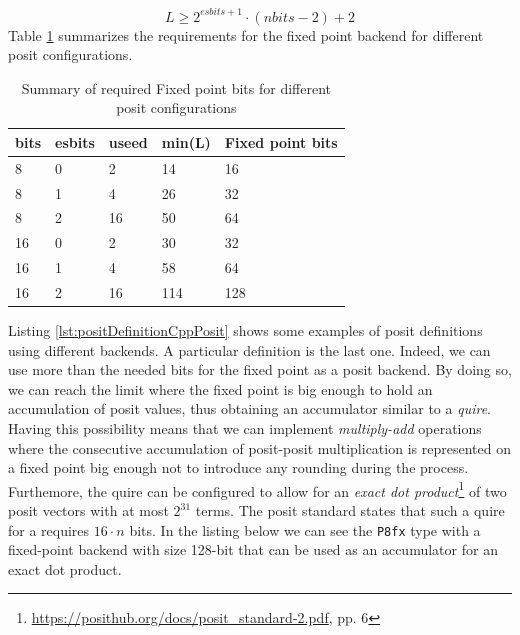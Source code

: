 \begin{equation}
    L \geq 2^{esbits + 1} \cdot (nbits - 2) + 2
\end{equation}
Table \ref{tab:fixedPointToPositSize} summarizes the requirements for the fixed point backend for different posit configurations.

\begin{table}[]
\centering
\caption{Summary of required Fixed point bits for different posit configurations}
\label{tab:fixedPointToPositSize}
\begin{tabular}{lllll}

bits & esbits & useed & min(L) & Fixed point bits \\ \hline
8    & 0      & 2     & 14     & 16               \\
8    & 1      & 4     & 26     & 32               \\
8    & 2      & 16    & 50     & 64               \\
16   & 0      & 2     & 30     & 32               \\
16   & 1      & 4     & 58     & 64               \\
16   & 2      & 16    & 114    & 128              \\ \hline
\end{tabular}
\end{table}

Listing \ref{lst:positDefinitionCppPosit} shows some examples of posit definitions using different backends. A particular definition is the last one. Indeed, we can use more than the needed bits for the fixed point as a posit backend. By doing so, we can reach the limit where the fixed point is big enough to hold an accumulation of posit values, thus obtaining an accumulator similar to a \textit{quire}. Having this possibility means that we can implement \textit{multiply-add} operations where the consecutive accumulation of posit-posit multiplication is represented on a fixed point big enough not to introduce any rounding during the process. Furthemore, the quire can be configured to allow for an \textit{exact dot product}\footnote{\url{https://posithub.org/docs/posit_standard-2.pdf}, pp. 6} of two posit vectors with at most $2^{31}$ terms. The posit standard states that such a quire for a  requires $16\cdot n$ bits. In the listing below we can see the \texttt{P8fx} type with a fixed-point backend with size 128-bit that can be used as an accumulator for an exact dot product.





